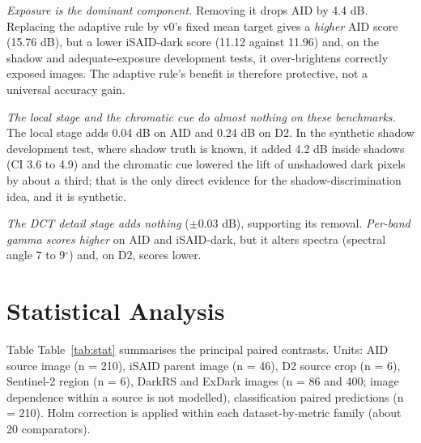 \documentclass[conference]{IEEEtran}
\begin{document}
\begin{table}[t]
\caption{Ablations of TASC-v1 C2 (test data). PSNR in dB. A dash means the variant was not run on that dataset.}
\label{tab:abl}
\centering\scriptsize
\setlength{\tabcolsep}{2.5pt}
\end{table}
\emph{Exposure is the dominant component.} Removing it drops AID by 4.4 dB. Replacing the adaptive rule by v0's fixed mean target gives a \emph{higher} AID score (15.76 dB), but a lower iSAID-dark score (11.12 against 11.96) and, on the shadow and adequate-exposure development tests, it over-brightens correctly exposed images. The adaptive rule's benefit is therefore protective, not a universal accuracy gain.

\emph{The local stage and the chromatic cue do almost nothing on these benchmarks.} The local stage adds 0.04 dB on AID and 0.24 dB on D2. In the synthetic shadow development test, where shadow truth is known, it added 4.2 dB inside shadows (CI 3.6 to 4.9) and the chromatic cue lowered the lift of unshadowed dark pixels by about a third; that is the only direct evidence for the shadow-discrimination idea, and it is synthetic.

\emph{The DCT detail stage adds nothing} ($\pm$0.03 dB), supporting its removal. \emph{Per-band gamma scores higher} on AID and iSAID-dark, but it alters spectra (spectral angle 7 to 9$^{\circ}$) and, on D2, scores lower.

\section{Statistical Analysis}
Table Table~\ref{tab:stat} summarises the principal paired contrasts. Units: AID source image (n = 210), iSAID parent image (n = 46), D2 source crop (n = 6), Sentinel-2 region (n = 6), DarkRS and ExDark images (n = 86 and 400; image dependence within a source is not modelled), classification paired predictions (n = 210). Holm correction is applied within each dataset-by-metric family (about 20 comparators).
\end{document}
